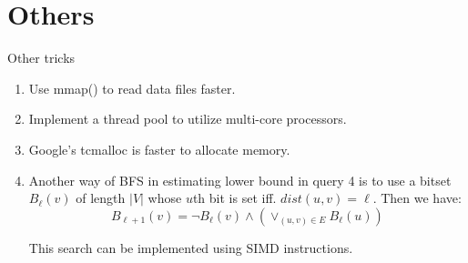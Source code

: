 

\section{Others}
\begin{frame}{Other tricks}
  \begin{enumerate}

    \item Use mmap() to read data files faster.

    \item Implement a thread pool to utilize multi-core processors.

    \item Google's tcmalloc is faster to allocate memory.

    \item

      Another way of BFS in estimating lower bound in query 4
      is to use a bitset $ B_{\ell}(v)$ of length $ |V|$ whose $ u$th bit
      is set iff. $ dist(u, v) =\ell$. Then we have:
      \[ B_{\ell+1}(v)  = \neg B_{\ell}(v) \wedge (\vee_{(u, v) \in E}B_{\ell}(u))\]

      This search can be implemented using SIMD instructions.
  \end{enumerate}
\end{frame}
